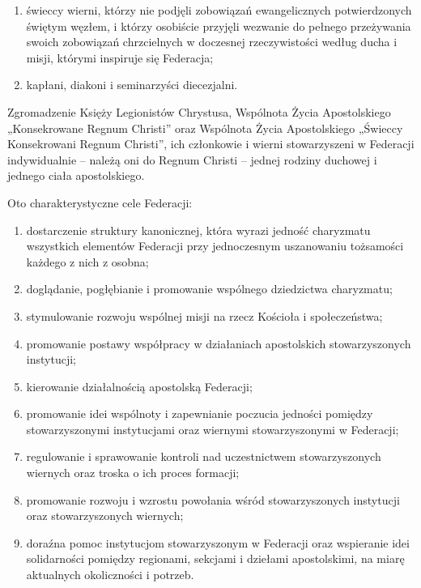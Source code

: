 \begin{enumerate}


\item świeccy wierni, którzy nie podjęli zobowiązań ewangelicznych potwierdzonych świętym węzłem, i którzy osobiście przyjęli wezwanie do pełnego przeżywania swoich zobowiązań chrzcielnych w doczesnej rzeczywistości według ducha i misji, którymi inspiruje się Federacja;


\item kapłani, diakoni i seminarzyści diecezjalni.


\end{enumerate}
 


 Zgromadzenie Księży Legionistów Chrystusa, Wspólnota Życia Apostolskiego „Konsekrowane Regnum Christi” oraz Wspólnota Życia Apostolskiego „Świeccy Konsekrowani Regnum Christi”, ich członkowie i wierni stowarzyszeni w Federacji indywidualnie – należą oni do Regnum Christi – jednej rodziny duchowej i jednego ciała apostolskiego.




 Oto charakterystyczne  cele Federacji:


\begin{enumerate}


\item dostarczenie struktury kanonicznej, która wyrazi jedność charyzmatu wszystkich elementów Federacji przy jednoczesnym uszanowaniu tożsamości każdego z nich z osobna;


\item doglądanie, pogłębianie i promowanie wspólnego dziedzictwa charyzmatu;


\item stymulowanie rozwoju wspólnej misji na rzecz Kościoła i społeczeństwa;


\item promowanie postawy współpracy w działaniach apostolskich stowarzyszonych instytucji;


\item kierowanie działalnością apostolską Federacji;


\item promowanie idei wspólnoty i zapewnianie poczucia jedności pomiędzy stowarzyszonymi instytucjami oraz wiernymi stowarzyszonymi w Federacji;


\item regulowanie i sprawowanie kontroli nad uczestnictwem stowarzyszonych wiernych oraz troska o ich proces formacji;


\item promowanie rozwoju i wzrostu powołania wśród stowarzyszonych instytucji oraz stowarzyszonych wiernych;


\item doraźna pomoc instytucjom stowarzyszonym w Federacji oraz wspieranie idei solidarności pomiędzy regionami, sekcjami i dziełami apostolskimi, na miarę aktualnych okoliczności i potrzeb.


\end{enumerate}
 
